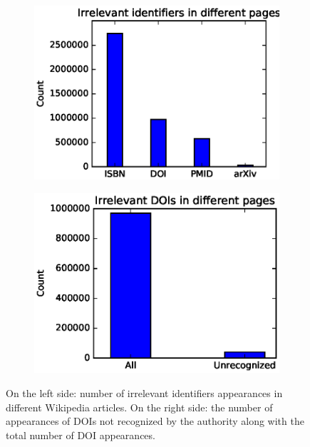 \begin{figure}[h]
    \centering
    \begin{subfigure}{.5\textwidth}
        \centering
        \includegraphics[keepaspectratio=true, width=\textwidth]{assets/irrelevant_identifiers_count_by_type}
    \end{subfigure}%
    \begin{subfigure}{.5\textwidth}
        \centering
        \includegraphics[keepaspectratio=true, width=\textwidth]{assets/irrelevant_doi_count_by_validity}
    \end{subfigure}
    \caption{On the left side: number of irrelevant identifiers appearances in different Wikipedia articles.
    On the right side: the number of appearances of DOIs not recognized by the authority along with the total number of DOI appearances.}
\label{fig:irrelevant_identifiers_count}
\end{figure}




